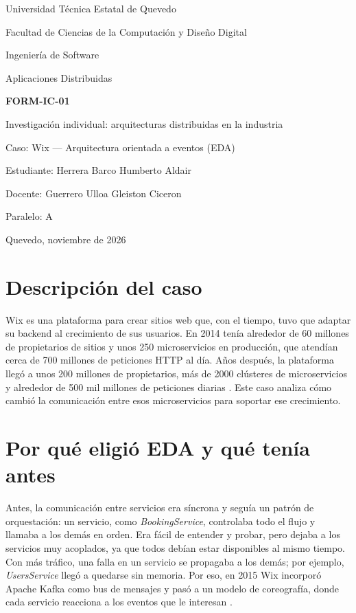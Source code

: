\documentclass[11pt,a4paper]{article}
\begin{document}
\begin{titlepage}
  \centering
  {\large Universidad Técnica Estatal de Quevedo\par}
  {\large Facultad de Ciencias de la Computación y Diseño Digital\par}
  {\large Ingeniería de Software\par}
  \vspace{1.5cm}
  {\large Aplicaciones Distribuidas\par}
  \vspace{1.5cm}
  {\Large\bfseries FORM-IC-01\par}
  {\Large Investigación individual: arquitecturas distribuidas en la industria\par}
  \vspace{1cm}
  {\large Caso: Wix — Arquitectura orientada a eventos (EDA)\par}
  \vfill
  {\large Estudiante: Herrera Barco Humberto Aldair\par}
  {\large Docente: Guerrero Ulloa Gleiston Ciceron\par}
  {\large Paralelo: A\par}
  \vspace{1cm}
  {\large Quevedo, noviembre de 2026\par}
\end{titlepage}

\section*{Descripción del caso}
Wix es una plataforma para crear sitios web que, con el tiempo, tuvo que adaptar su backend al crecimiento de sus usuarios. En 2014 tenía alrededor de 60 millones de propietarios de sitios y unos 250 microservicios en producción, que atendían cerca de 700 millones de peticiones HTTP al día. Años después, la plataforma llegó a unos 200 millones de propietarios, más de 2000 clústeres de microservicios y alrededor de 500 mil millones de peticiones diarias \cite{perez2021wix}. Este caso analiza cómo cambió la comunicación entre esos microservicios para soportar ese crecimiento.

\section*{Por qué eligió EDA y qué tenía antes}
Antes, la comunicación entre servicios era síncrona y seguía un patrón de orquestación: un servicio, como \textit{BookingService}, controlaba todo el flujo y llamaba a los demás en orden. Era fácil de entender y probar, pero dejaba a los servicios muy acoplados, ya que todos debían estar disponibles al mismo tiempo. Con más tráfico, una falla en un servicio se propagaba a los demás; por ejemplo, \textit{UsersService} llegó a quedarse sin memoria. Por eso, en 2015 Wix incorporó Apache Kafka como bus de mensajes y pasó a un modelo de coreografía, donde cada servicio reacciona a los eventos que le interesan \cite{perez2021wix}.
\end{document}
